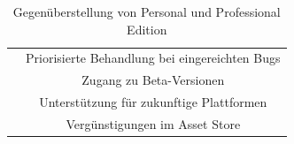 \begin{table}[htbp]
{\begin{tabular}{c|c|}
			& Priorisierte Behandlung bei eingereichten Bugs                                                                                         \\ \cline{2-2} 
			& Zugang zu Beta-Versionen                                                                                                               \\ \cline{2-2} 
			& Unterstützung für zukunftige Plattformen                                                                                               \\ \cline{2-2} 
			& Vergünstigungen im Asset Store                                                                                                         \\ \cline{2-2} 
		\end{tabular}
	}
	\caption{Gegenüberstellung von Personal und Professional Edition}
	\label{Unity_Produkte}\citep{unity_products}
\end{table}





